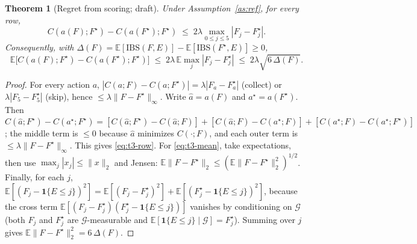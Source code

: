 \documentclass[10pt]{article}
\newtheorem{theorem}{Theorem}
\begin{document}
\begin{theorem}[Regret from scoring; draft]\label{thm:t3}
Under Assumption~\ref{as:ref}, for every row,
\begin{equation}
C(a(F);F^\star)-C(a(F^\star);F^\star)\;\le\;2\lambda\max_{0\le j\le5}|F_j-F^\star_j| .
\label{eq:t3-row}
\end{equation}
Consequently, with $\Delta(F)=\mathbb E[\mathrm{IBS}(F,E)]-\mathbb E[\mathrm{IBS}(F^\star,E)]\ge0$,
\begin{equation}
\mathbb E\bigl[C(a(F);F^\star)-C(a(F^\star);F^\star)\bigr]\;\le\;2\lambda\,\mathbb E\max_j|F_j-F^\star_j|\;\le\;2\lambda\sqrt{6\,\Delta(F)} .
\label{eq:t3-mean}
\end{equation}
\end{theorem}

\begin{proof}
For every action $a$, $|C(a;F)-C(a;F^\star)|=\lambda|F_a-F^\star_a|$ (collect) or $\lambda|F_5-F^\star_5|$ (skip), hence $\le\lambda\|F-F^\star\|_\infty$. Write $\hat a=a(F)$ and $a^\star=a(F^\star)$. Then
$C(\hat a;F^\star)-C(a^\star;F^\star)=[C(\hat a;F^\star)-C(\hat a;F)]+[C(\hat a;F)-C(a^\star;F)]+[C(a^\star;F)-C(a^\star;F^\star)]$; the middle term is $\le0$ because $\hat a$ minimizes $C(\cdot;F)$, and each outer term is $\le\lambda\|F-F^\star\|_\infty$. This gives \eqref{eq:t3-row}. For \eqref{eq:t3-mean}, take expectations, then use $\max_j|x_j|\le\|x\|_2$ and Jensen: $\mathbb E\|F-F^\star\|_2\le(\mathbb E\|F-F^\star\|_2^2)^{1/2}$. Finally, for each $j$, $\mathbb E[(F_j-\mathbf 1\{E\le j\})^2]=\mathbb E[(F_j-F^\star_j)^2]+\mathbb E[(F^\star_j-\mathbf 1\{E\le j\})^2]$, because the cross term $\mathbb E[(F_j-F^\star_j)(F^\star_j-\mathbf 1\{E\le j\})]$ vanishes by conditioning on $\mathcal G$ (both $F_j$ and $F^\star_j$ are $\mathcal G$-measurable and $\mathbb E[\mathbf 1\{E\le j\}\mid\mathcal G]=F^\star_j$). Summing over $j$ gives $\mathbb E\|F-F^\star\|_2^2=6\,\Delta(F)$.
\end{proof}
\end{document}

